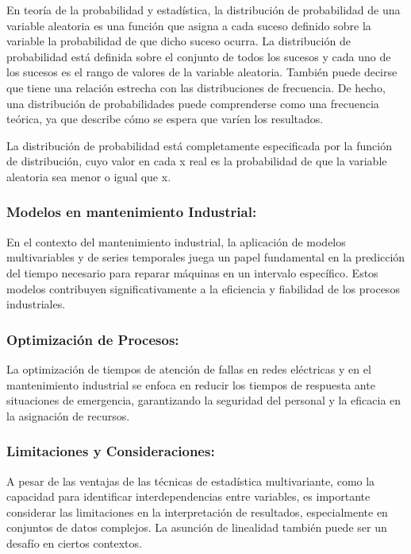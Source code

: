 \documentclass[
  11pt,
  bookmarksnumbered]{article}
\begin{document}
En teoría de la probabilidad y estadística, la distribución de probabilidad de una variable aleatoria es una función que asigna a cada suceso definido sobre la variable la probabilidad de que dicho suceso ocurra.
La distribución de probabilidad está definida sobre el conjunto de todos los sucesos y cada uno de los sucesos es el rango de valores de la variable aleatoria.
También puede decirse que tiene una relación estrecha con las distribuciones de frecuencia.
De hecho, una distribución de probabilidades puede comprenderse como una frecuencia teórica, ya que describe cómo se espera que varíen los resultados.

La distribución de probabilidad está completamente especificada por la función de distribución, cuyo valor en cada x real es la probabilidad de que la variable aleatoria sea menor o igual que x.

\hypertarget{modelos-en-mantenimiento-industrial}{%
\subsubsection{Modelos en mantenimiento Industrial:}\label{modelos-en-mantenimiento-industrial}}

En el contexto del mantenimiento industrial, la aplicación de modelos multivariables y de series temporales juega un papel fundamental en la predicción del tiempo necesario para reparar máquinas en un intervalo específico.
Estos modelos contribuyen significativamente a la eficiencia y fiabilidad de los procesos industriales.

\hypertarget{optimizaciuxf3n-de-procesos}{%
\subsubsection{Optimización de Procesos:}\label{optimizaciuxf3n-de-procesos}}

La optimización de tiempos de atención de fallas en redes eléctricas y en el mantenimiento industrial se enfoca en reducir los tiempos de respuesta ante situaciones de emergencia, garantizando la seguridad del personal y la eficacia en la asignación de recursos.

\hypertarget{limitaciones-y-consideraciones}{%
\subsubsection{Limitaciones y Consideraciones:}\label{limitaciones-y-consideraciones}}

A pesar de las ventajas de las técnicas de estadística multivariante, como la capacidad para identificar interdependencias entre variables, es importante considerar las limitaciones en la interpretación de resultados, especialmente en conjuntos de datos complejos.
La asunción de linealidad también puede ser un desafío en ciertos contextos.
\end{document}
